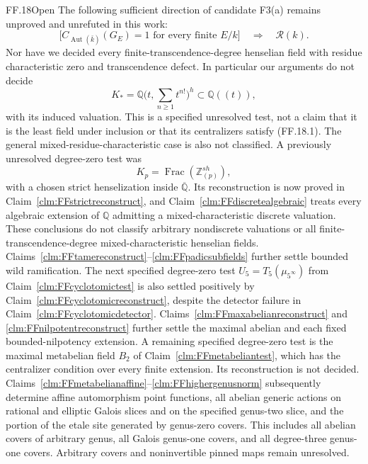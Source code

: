 \begin{claim}{FF.18}{Open}\label{clm:FFremaining}
The following sufficient direction of candidate F3(a) remains
unproved and unrefuted in this work:
\[
 \bigl[C_{\operatorname{Aut}(\bar k)}(G_E)=1
          \text{ for every finite }E/k\bigr]
                  \quad\Longrightarrow\quad\mathcal R(k).
\tag{FF.18.1}
\]
Nor have we decided every finite-transcendence-degree henselian
field with residue characteristic zero and transcendence defect.
In particular our arguments do not decide
\[
 K_* = \mathbb Q\bigl(t,\sum_{n\geq1}t^{n!}\bigr)^h
           \subset\mathbb Q((t)),
\tag{FF.18.2}
\]
with its induced valuation. This is a specified unresolved test,
not a claim that it is the least field under inclusion or that
its centralizers satisfy (FF.18.1).
The general mixed-residue-characteristic case is also not
classified. A previously unresolved degree-zero test was
\[
                  K_p=\operatorname{Frac}(\mathbb Z_{(p)}^{sh}),
                                                        \tag{FF.18.3}
\]
with a chosen strict henselization inside
\(\overline{\mathbb Q}\). Its reconstruction is now
proved in Claim~\ref{clm:FFstrictreconstruct}, and
Claim~\ref{clm:FFdiscretealgebraic} treats every algebraic
extension of \(\mathbb Q\) admitting a mixed-characteristic
discrete valuation. These conclusions do not classify
arbitrary nondiscrete valuations or all finite-transcendence-degree
mixed-characteristic henselian fields.
Claims~\ref{clm:FFtamereconstruct}--\ref{clm:FFpadicsubfields}
further settle bounded wild ramification. The next
specified degree-zero test
\(U_5=T_5(\mu_{5^\infty})\) from
Claim~\ref{clm:FFcyclotomictest} is also settled
positively by Claim~\ref{clm:FFcyclotomicreconstruct},
despite the detector failure in
Claim~\ref{clm:FFcyclotomicdetector}.
Claims~\ref{clm:FFmaxabelianreconstruct} and
\ref{clm:FFnilpotentreconstruct} further settle the
maximal abelian and each fixed bounded-nilpotency
extension. A remaining specified degree-zero
test is the maximal metabelian field
\(B_2\) of Claim~\ref{clm:FFmetabeliantest},
which has the centralizer condition over every
finite extension. Its reconstruction is not decided.
Claims~\ref{clm:FFmetabelianaffine}--\ref{clm:FFhighergenusnorm}
subsequently determine affine automorphism point functions,
all abelian generic actions on rational and elliptic
Galois slices and on the specified genus-two slice,
and the portion of the etale site
generated by genus-zero covers. This includes all
abelian covers of arbitrary genus, all Galois genus-one
covers, and all degree-three genus-one covers.
Arbitrary covers and noninvertible pinned maps
remain unresolved.
\end{claim}
